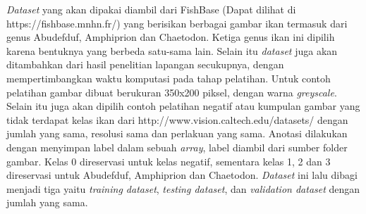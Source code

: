 \textit{Dataset} yang akan dipakai diambil dari FishBase (Dapat dilihat di https://fishbase.mnhn.fr/) yang 
berisikan berbagai gambar ikan termasuk dari genus Abudefduf, Amphiprion dan Chaetodon. 
Ketiga genus ikan ini dipilih karena bentuknya yang berbeda satu-sama lain. Selain itu 
\textit{dataset} juga akan ditambahkan dari hasil penelitian lapangan 
secukupnya, dengan mempertimbangkan waktu komputasi pada tahap 
pelatihan.
Untuk contoh pelatihan gambar dibuat berukuran 350x200 piksel, 
dengan warna \textit{greyscale}. Selain itu juga akan dipilih contoh 
pelatihan negatif atau kumpulan gambar yang tidak terdapat kelas 
ikan dari http://www.vision.caltech.edu/datasets/ dengan jumlah yang sama, resolusi sama dan perlakuan 
yang sama. Anotasi dilakukan dengan menyimpan label dalam sebuah \textit{array}, label 
diambil dari sumber folder gambar. Kelas 0 direservasi untuk kelas negatif, sementara kelas 
1, 2 dan 3 direservasi untuk Abudefduf, Amphiprion dan Chaetodon.
\textit{Dataset} ini lalu dibagi menjadi tiga yaitu \textit{training dataset}, 
\textit{testing dataset}, dan \emph{validation dataset} dengan jumlah yang sama.



